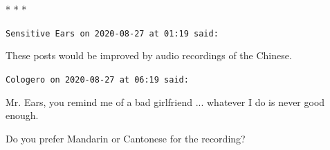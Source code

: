 
\begin{center}* * *\end{center}

\begin{footnotesize}
\begin{sffamily}
\texttt{Sensitive Ears on 2020-08-27 at 01:19 said:}

These posts would be improved by audio recordings of the Chinese.

\hfill

\texttt{Cologero on 2020-08-27 at 06:19 said:}

Mr. Ears, you remind me of a bad girlfriend ... whatever I do is never good enough.

Do you prefer Mandarin or Cantonese for the recording?


\hfill

\end{sffamily}
\end{footnotesize}

